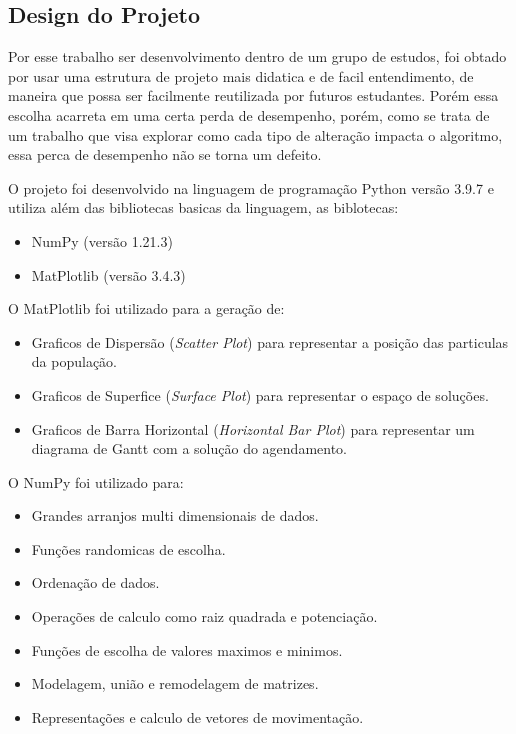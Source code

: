     \subsection{Design do Projeto}
        Por esse trabalho ser desenvolvimento dentro de um grupo de estudos, foi obtado por usar uma estrutura de projeto mais didatica e de facil entendimento, de maneira que possa ser facilmente reutilizada por futuros estudantes. Porém essa escolha acarreta em uma certa perda de desempenho, porém, como se trata de um trabalho que visa explorar como cada tipo de alteração impacta o algoritmo, essa perca de desempenho não se torna um defeito.\newline
        
        O projeto foi desenvolvido na linguagem de programação Python versão 3.9.7 e utiliza além das bibliotecas basicas da linguagem, as biblotecas:
        \begin{itemize}
            \item NumPy (versão 1.21.3)
            \item MatPlotlib (versão 3.4.3)
        \end{itemize}

        \noindent O MatPlotlib foi utilizado para a geração de: 
        \begin{itemize}
            \item Graficos de Dispersão (\textit{Scatter Plot}) para representar a posição das particulas da população.
            \item Graficos de Superfice (\textit{Surface Plot}) para representar o espaço de soluções.
            \item Graficos de Barra Horizontal (\textit{Horizontal Bar Plot}) para representar um diagrama de Gantt com a solução do agendamento.
        \end{itemize}

        \noindent O NumPy foi utilizado para: 
        \begin{itemize}
            \item Grandes arranjos multi dimensionais de dados. 
            \item Funções randomicas de escolha.
            \item Ordenação de dados.
            \item Operações de calculo como raiz quadrada e potenciação.
            \item Funções de escolha de valores maximos e minimos.
            \item Modelagem, união e remodelagem de matrizes.
            \item Representações e calculo de vetores de movimentação.
        \end{itemize}
        


